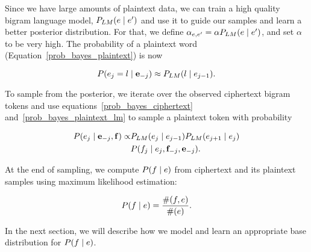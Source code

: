 
Since we have large amounts of plaintext data, we can train a high quality bigram language model, $P_{LM}(e \mid e')$ and use it to guide our samples and learn a better posterior distribution. For that, we define $\alpha_{e,e'} = \alpha P_{LM}(e \mid e')$, and set $\alpha$ to be very high. The probability of a plaintext word (Equation~\ref{prob_bayes_plaintext}) is now

\begin{equation} \label{prob_bayes_plaintext_lm}
P(e_j = l \mid \mathbf{e}_{-j}) \approx P_{LM}(l \mid e_{j-1}).
\end{equation}


To sample from the posterior, we iterate over the observed ciphertext bigram tokens and use equations~\ref{prob_bayes_ciphertext} and~\ref{prob_bayes_plaintext_lm} to sample a plaintext token with probability

\begin{align} \label{prob_sampling_plaintext}
P( e_j \mid \mathbf{e}_{-j}, \mathbf{f} ) \propto & P_{LM}(e_j \mid e_{j-1})  P_{LM}(e_{j+1} \mid e_{j})  \notag \\
                                                                                                & P(f_j \mid e_j,\mathbf{f}_{-j}, \mathbf{e}_{-j}).
\end{align}

\iffalse
%
\[
\label{p_sample}
P_{sample}(e_{1}e_{2}) =  P(e_{1}e_{2}) \prod_{i=1}^{2}P_{CRP}(f_{i}|e_{i})
\]
%
In the above equation, the translation probability $P_{CRP}(f_{i}|e_{i})$ is modeled by Chinese Restaurant Process(CRP), and is defined in Equation \ref{p_channel}.
%
\[
\label{p_channel}
P_{CRP}(f_{i}|e_{i}) = \frac{\alpha P_0(f_{i}|e_{i})+count(f_{i},e_{i})}{\alpha+count(e_{i})}
\]
%
where $P_{0}$ is a base distribution, also known as a prior, and $\alpha$ is a parameter that controls how much we trust the base distribution. $count(f_{i},e_{i})$ and $count(e_{i})$ record the number of times $f_{i},e_{i}$ and $e_{i}$ appear in previously generated samples respectively. The base distribution is given independently, and in all the previous work, it is set to uniform.
\fi

At the end of sampling, we compute $P(f \mid e)$ from ciphertext and its plaintext samples using maximum likelihood estimation:

\[
\label{mlh_estimation}
P(f \mid e) =  \frac{\#(f,e)}{\#(e)}.
\]

In the next section, we will describe how we model and learn an appropriate base distribution for $P(f \mid e)$.


